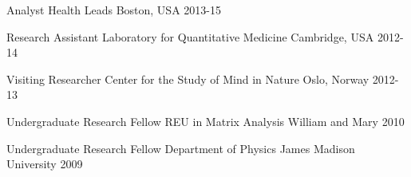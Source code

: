 

\begin{cventries}

  \cventry
    {Analyst} %
    {Health Leads} %
    {Boston, USA} %
    {2013-15} %
    {}

  \cventry
    {Research Assistant} %
    {Laboratory for Quantitative Medicine} %
    {Cambridge, USA} %
    {2012-14} %
    {}

  \cventry
    {Visiting Researcher} %
    {Center for the Study of Mind in Nature} %
    {Oslo, Norway} %
    {2012-13} %
    {}

  \cventry
    {Undergraduate Research Fellow} %
    {REU in Matrix Analysis} %
    {William and Mary} %
    {2010} %
    {}
    
  \cventry
    {Undergraduate Research Fellow} %
    {Department of Physics} %
    {James Madison University} %
    {2009} %
    {}


\end{cventries}
